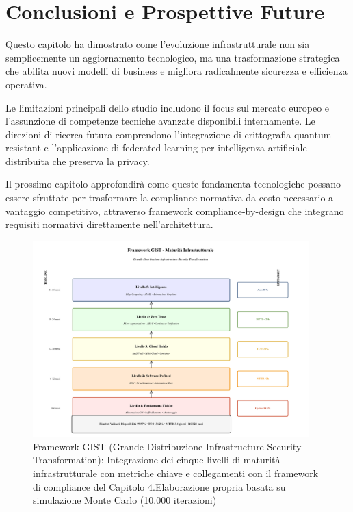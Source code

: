 \section{\texorpdfstring{Conclusioni e Prospettive Future}{3.9 - Conclusioni e Prospettive Future}}

Questo capitolo ha dimostrato come l'evoluzione infrastrutturale non sia semplicemente un aggiornamento tecnologico, ma una trasformazione strategica che abilita nuovi modelli di business e migliora radicalmente sicurezza e efficienza operativa.

Le limitazioni principali dello studio includono il focus sul mercato europeo e l'assunzione di competenze tecniche avanzate disponibili internamente. Le direzioni di ricerca futura comprendono l'integrazione di crittografia quantum-resistant e l'applicazione di federated learning per intelligenza artificiale distribuita che preserva la privacy.

Il prossimo capitolo approfondirà come queste fondamenta tecnologiche possano essere sfruttate per trasformare la compliance normativa da costo necessario a vantaggio competitivo, attraverso framework compliance-by-design che integrano requisiti normativi direttamente nell'architettura.

\begin{figure}[htbp]
\centering
\includegraphics[width=0.95\textwidth]{thesis_figures/cap3/fig_3_3_gist_framework.pdf}
\caption{Framework GIST (Grande Distribuzione Infrastructure Security Transformation): Integrazione dei cinque livelli di maturità infrastrutturale con metriche chiave e collegamenti con il framework di compliance del Capitolo 4.Elaborazione propria basata su simulazione Monte Carlo (10.000 iterazioni)}
\label{fig:framework_gist_complete}
\end{figure}

\clearpage
\printbibliography[
    heading=subbibliography,
    title={Riferimenti Bibliografici del Capitolo 3},
    segment=\therefsegment
]


\clearpage